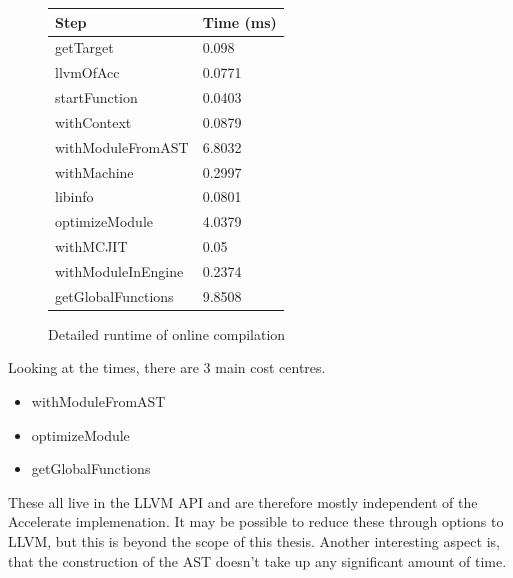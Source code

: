 \documentclass[a4paper,bibliography=totocnumbered,parskip,headsepline]{scrbook}
\begin{document}
\begin{figure}
    \centering
\begin{tabular}{ll}
Step             & Time (ms)   \\ \hline
getTarget        & 0.098  \\
llvmOfAcc              & 0.0771 \\
startFunction    & 0.0403 \\
withContext      & 0.0879 \\
withModuleFromAST       & 6.8032 \\
withMachine      & 0.2997 \\
libinfo          & 0.0801 \\
optimizeModule   & 4.0379 \\
withMCJIT        & 0.05   \\
withModuleInEngine   & 0.2374 \\
getGlobalFunctions & 9.8508 \\
\end{tabular}
\caption{Detailed runtime of online compilation}
    \label{fig:compile}
\end{figure}

Looking at the times, there are 3 main cost centres.

\begin{itemize}[noitemsep]
 \item withModuleFromAST
 \item optimizeModule
 \item getGlobalFunctions
\end{itemize}

\newpage
These all live in the LLVM API and are therefore mostly independent of the Accelerate implemenation.
It may be possible to reduce these through options to LLVM, but this is beyond the scope of this thesis.
Another interesting aspect is, that the construction of the AST doesn't take up any significant amount of time.
\end{document}
